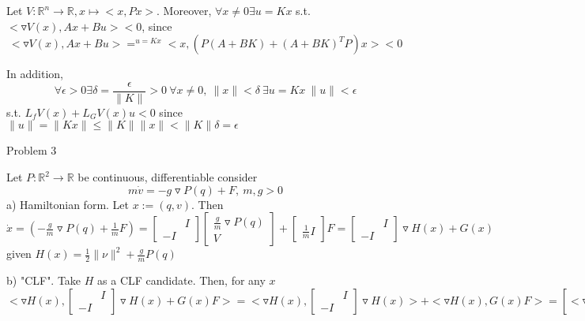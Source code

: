 Let $V: \mathbb{R}^n \to \mathbb{R}, x \mapsto <x, Px>$. Moreover, $\forall x \neq 0 \exists u = Kx$ s.t. $<\triangledown V(x), Ax+Bu> < 0$, since 
\begin{equation*}
<\triangledown V(x), Ax+Bu> =^{u = Kx} <x, (P(A+BK)+ (A+BK)^TP)x> < 0
\end{equation*} 

In addition,
\begin{equation*}
\forall \epsilon > 0 \exists \delta = \frac{\epsilon}{\|K\| } > 0 \ \forall x \neq 0, \ \|x\| < \delta \ \exists u = Kx \ \|u\| < \epsilon 
\end{equation*}
s.t. $L_fV(x) + L_GV(x)u < 0$ since $\|u\| = \|Kx\| \leq \|K\|\|x\| < \|K\|\delta = \epsilon$

Problem 3

Let $P: \mathbb{R}^2 \to \mathbb{R}$ be continuous, differentiable consider 
\begin{equation*}
m\dot{v}  = - g \triangledown P(q) + F, \ m,g >0
\end{equation*} 
a) Hamiltonian form. Let $x:=(q,v)$. Then $\dot{x} = (-\frac{g}{m}\triangledown P(q) + \frac{1}{m}F)= \begin{bmatrix}
 & I \\
 -I & 
\end{bmatrix}\begin{bmatrix}
 \frac{g}{m}\triangledown P(q) \\
 V 
\end{bmatrix} + \begin{bmatrix}
  \\
 \frac{1}{m}I
\end{bmatrix}F = \begin{bmatrix}
 & I \\
 -I & 
\end{bmatrix} \triangledown H(x) + G(x)$ given $H(x) = \frac{1}{2}\|\nu\|^2 + \frac{g}{m}P(q)$

b) "CLF". Take $H$ as a CLF candidate. Then, for any $x$ 
\begin{equation*}
<\triangledown H(x), \begin{bmatrix}
 & I \\
 -I & 
\end{bmatrix} \triangledown H(x) + G(x)F> = <\triangledown H(x), \begin{bmatrix}
 & I \\
 -I & 
\end{bmatrix} \triangledown H(x)> + <\triangledown H(x), G(x)F> = [<\triangledown H(x), \begin{bmatrix}
 & I \\
 -I & 
\end{bmatrix} \triangledown H(x)> = L_fH(x) = 0] = \frac{1}{m} <\nu, F>
\end{equation*}

